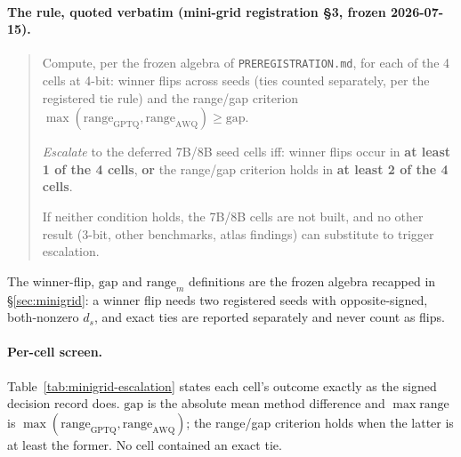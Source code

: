 \paragraph{The rule, quoted verbatim (mini-grid registration \S3, frozen
2026-07-15).}
\begin{quote}
Compute, per the frozen algebra of \texttt{PREREGISTRATION.md}, for each of the
4 cells at 4-bit: winner flips across seeds (ties counted separately, per the
registered tie rule) and the range/gap criterion
$\max(\mathrm{range}_{\mathrm{GPTQ}}, \mathrm{range}_{\mathrm{AWQ}}) \geq
\mathrm{gap}$.

\emph{Escalate} to the deferred 7B/8B seed cells iff: winner flips occur in
\textbf{at least 1 of the 4 cells}, \textbf{or} the range/gap criterion holds in
\textbf{at least 2 of the 4 cells}.

If neither condition holds, the 7B/8B cells are not built, and no other result
(3-bit, other benchmarks, atlas findings) can substitute to trigger escalation.
\end{quote}

The winner-flip, $\mathrm{gap}$ and $\mathrm{range}_m$ definitions are the frozen
algebra recapped in \S\ref{sec:minigrid}: a winner flip needs two registered
seeds with opposite-signed, both-nonzero $d_s$, and exact ties are reported
separately and never count as flips.

\paragraph{Per-cell screen.}
Table~\ref{tab:minigrid-escalation} states each cell's outcome exactly as the
signed decision record does. $\mathrm{gap}$ is the absolute mean method
difference and $\max\mathrm{range}$ is
$\max(\mathrm{range}_{\mathrm{GPTQ}},\mathrm{range}_{\mathrm{AWQ}})$; the
range/gap criterion holds when the latter is at least the former. No cell
contained an exact tie.

